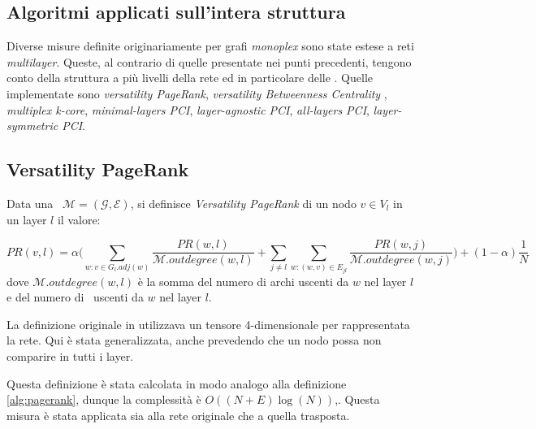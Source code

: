 \subsection{Algoritmi applicati sull'intera struttura}
Diverse misure definite originariamente per grafi \textit{monoplex} sono state estese a 
reti \textit{multilayer}. Queste, al contrario di quelle presentate nei punti precedenti,
tengono conto della struttura a più livelli della rete ed in particolare delle \interc.
Quelle implementate sono \textit{versatility PageRank}\cite{dedomenico:versatile},
\textit{versatility Betweenness Centrality}\cite{dedomenico:versatile} \cite{dedomenico:verbetw},
\textit{multiplex k-core}\cite{azimi:multikcore},
\textit{minimal-layers PCI}\cite{basaras:infspmul},
\textit{layer-agnostic PCI}\cite{basaras:infspmul},
\textit{all-layers PCI}\cite{basaras:infspmul},
\textit{layer-symmetric PCI}\cite{basaras:infspmul}.

\subsection{Versatility PageRank}
\begin{definizione}
    Data una \muln\ $\mathcal{M}=(\mathcal{G}, \mathcal{E})$,
    si definisce \textit{Versatility PageRank} di un nodo $v \in V_l$ in un layer $l$
    il valore:

    \begin{equation}
        PR(v, l) = 
        \alpha \biggl( 
            \sum_{w : v \in G_l.adj(w)} \frac{PR(w, l)}{\mathcal{M}.outdegree(w, l)} +
            \sum_{j \neq l}^{}\sum_{w : (w, v) \in E_{jl}} \frac{PR(w, j)}{\mathcal{M}.outdegree(w, j)} 
        \biggr) + (1-\alpha)\frac{1}{N}
    \end{equation}
    dove $\mathcal{M}.outdegree(w, l)$ è la somma del numero di archi uscenti da $w$ nel layer $l$
    e del numero di \interc\ uscenti da $w$ nel layer $l$.

\end{definizione}

La definizione originale in \cite{dedomenico:versatile} utilizzava un tensore 4-dimensionale per 
rappresentata la rete. Qui è stata generalizzata, anche prevedendo che un nodo possa non comparire 
in tutti i layer.

Questa definizione è stata calcolata in modo analogo alla definizione \vref{alg:pagerank},
dunque la complessità è $O((N + E)\log(N))$,.
Questa misura è stata applicata sia alla rete originale che a quella trasposta.

